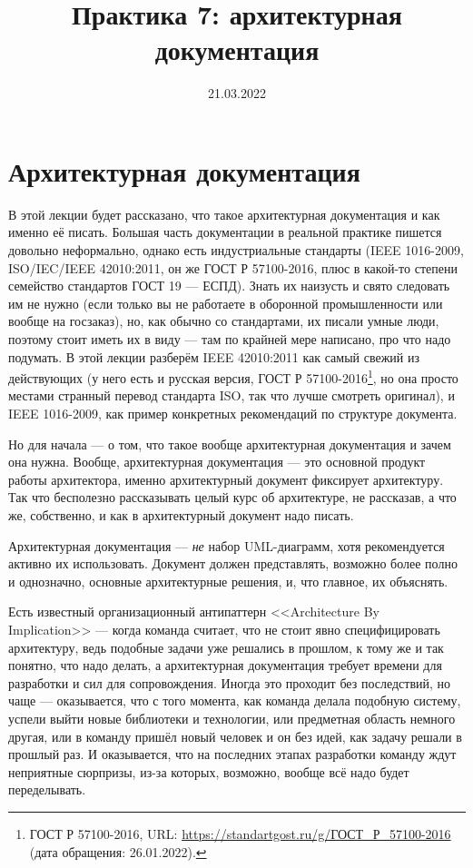 \documentclass[a5paper]{article}
\title{Практика 7: архитектурная документация}
\author{}
\date{21.03.2022}
\begin{document}
\maketitle
\thispagestyle{empty}

\section{Архитектурная документация}

В этой лекции будет рассказано, что такое архитектурная документация и как именно её писать. Большая часть документации в реальной практике пишется довольно неформально, однако есть индустриальные стандарты (IEEE 1016-2009, ISO/IEC/IEEE 42010:2011, он же ГОСТ Р 57100-2016, плюс в какой-то степени семейство стандартов ГОСТ 19 --- ЕСПД). Знать их наизусть и свято следовать им не нужно (если только вы не работаете в оборонной промышленности или вообще на госзаказ), но, как обычно со стандартами, их писали умные люди, поэтому стоит иметь их в виду --- там по крайней мере написано, про что надо подумать. В этой лекции разберём IEEE 42010:2011 как самый свежий из действующих  (у него есть и русская версия, ГОСТ Р 57100-2016\footnote{ГОСТ Р 57100-2016, URL: \url{https://standartgost.ru/g/ГОСТ_Р_57100-2016} (дата обращения: 26.01.2022).}, но она просто местами странный перевод стандарта ISO, так что лучше смотреть оригинал), и IEEE 1016-2009, как пример конкретных рекомендаций по структуре документа.

Но для начала --- о том, что такое вообще архитектурная документация и зачем она нужна. Вообще, архитектурная документация --- это основной продукт работы архитектора, именно архитектурный документ фиксирует архитектуру. Так что бесполезно рассказывать целый курс об архитектуре, не рассказав, а что же, собственно, и как в архитектурный документ надо писать.

Архитектурная документация --- \emph{не} набор UML-диаграмм, хотя рекомендуется активно их использовать. Документ должен представлять, возможно более полно и однозначно, основные архитектурные решения, и, что главное, их объяснять. 

Есть известный организационный антипаттерн <<Architecture By Implication>> --- когда команда считает, что не стоит явно специфицировать архитектуру, ведь подобные задачи уже решались в прошлом, к тому же и так понятно, что надо делать, а архитектурная документация требует времени для разработки и сил для сопровождения. Иногда это проходит без последствий, но чаще --- оказывается, что с того момента, как команда делала подобную систему, успели выйти новые библиотеки и технологии, или предметная область немного другая, или в команду пришёл новый человек и он без идей, как задачу решали в прошлый раз. И оказывается, что на последних этапах разработки команду ждут неприятные сюрпризы, из-за которых, возможно, вообще всё надо будет переделывать. 
\end{document}
